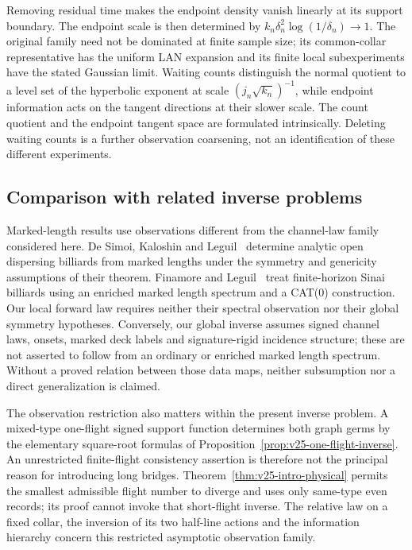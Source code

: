 Removing residual time makes the endpoint density vanish linearly at its
support boundary.  The endpoint scale is then determined by
\(k_n\delta_n^2\log(1/\delta_n)\to1\).  The original family need not be
dominated at finite sample size; its common-collar representative has the
uniform LAN expansion and its finite local subexperiments have the stated
Gaussian limit.  Waiting counts distinguish the normal quotient to a level
set of the hyperbolic exponent at scale \((j_n\sqrt{k_n})^{-1}\), while
endpoint information acts on the tangent directions at their slower scale.
The count quotient and the endpoint tangent space are formulated
intrinsically.  Deleting waiting counts is a further observation coarsening,
not an identification of these different experiments.

\subsection{Comparison with related inverse problems}

Marked-length results use observations different from the channel-law
family considered here.  De Simoi, Kaloshin and Leguil~\cite{DSKL} determine
analytic open dispersing billiards from marked lengths under the symmetry
and genericity assumptions of their theorem.  Finamore and
Leguil~\cite{FinamoreLeguil} treat finite-horizon Sinai billiards using an
enriched marked length spectrum and a CAT(0) construction.  Our local
forward law requires neither their spectral observation nor their global
symmetry hypotheses.  Conversely, our global inverse assumes signed channel
laws, onsets, marked deck labels and signature-rigid incidence structure;
these are not asserted to follow from an ordinary or enriched marked length
spectrum.  Without a proved relation between those data maps, neither
subsumption nor a direct generalization is claimed.

The observation restriction also matters within the present inverse
problem.  A mixed-type one-flight signed support function determines both
graph germs by the elementary square-root formulas of
Proposition~\ref{prop:v25-one-flight-inverse}.  An unrestricted finite-flight
consistency assertion is therefore not the principal reason for introducing
long bridges.  Theorem~\ref{thm:v25-intro-physical} permits the smallest
admissible flight number to diverge and uses only same-type even records;
its proof cannot invoke that short-flight inverse.  The relative law on a
fixed collar, the inversion of its two half-line actions and the information
hierarchy concern this restricted asymptotic observation family.

